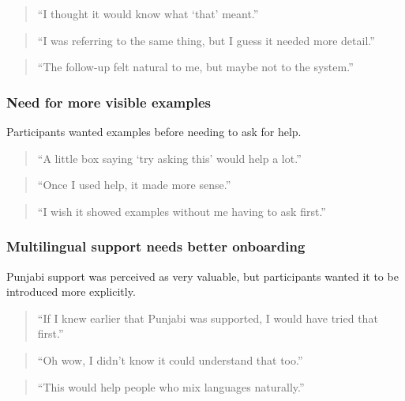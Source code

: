 \documentclass[12pt, titlepage]{article}
\begin{document}
\begin{quote}
``I thought it would know what `that' meant.''
\end{quote}

\begin{quote}
``I was referring to the same thing, but I guess it needed more
detail.''
\end{quote}

\begin{quote}
``The follow-up felt natural to me, but maybe not to the system.''
\end{quote}

\subsubsection{Need for more visible examples}

Participants wanted examples before needing to ask for help.

\begin{quote}
``A little box saying `try asking this' would help a lot.''
\end{quote}

\begin{quote}
``Once I used help, it made more sense.''
\end{quote}

\begin{quote}
``I wish it showed examples without me having to ask first.''
\end{quote}

\subsubsection{Multilingual support needs better onboarding}

Punjabi support was perceived as very valuable, but participants wanted
it to be introduced more explicitly.

\begin{quote}
``If I knew earlier that Punjabi was supported, I would have tried that
first.''
\end{quote}

\begin{quote}
``Oh wow, I didn't know it could understand that too.''
\end{quote}

\begin{quote}
``This would help people who mix languages naturally.''
\end{quote}
\end{document}
